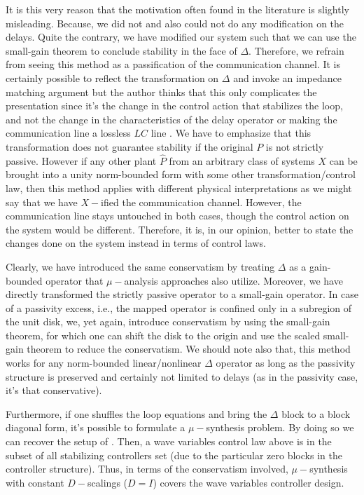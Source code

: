 It is this very reason that the motivation often found in the literature is slightly misleading. Because, we did not 
and also could not do any modification on the delays. Quite the contrary, we have modified our system such that we can use 
the small-gain theorem to conclude stability in the face of $\Delta$. Therefore, we refrain from seeing 
this method as a passification of the communication channel. It is certainly possible to reflect the transformation 
on $\Delta$ and invoke an impedance matching argument but the author thinks that this 
only complicates the presentation since it's the change in the control action that stabilizes the loop, and not the 
change in the characteristics of the delay operator or making the communication line a lossless $LC$ line
.
We have to emphasize that this transformation does not guarantee stability if the original $P$ is not strictly passive.
However if any other plant $\hat{P}$ from an arbitrary class of systems $X$ can be brought into a unity norm-bounded form 
with some other transformation/control law, then this method applies with different physical interpretations as we might 
say that we have $X-$ified the communication channel. However, the communication line stays untouched in both cases, though
the control action on the system would be different. Therefore, it is, in our opinion, better to state the changes done on the
system instead in terms of control laws.  



Clearly, we have introduced the same conservatism by treating $\Delta$ as a gain-bounded operator 
that $\mu-$analysis approaches also utilize. Moreover, we have directly transformed the strictly passive 
operator to a small-gain operator. In case of a passivity excess, i.e., the mapped operator is confined only 
in a subregion of the unit disk, we, yet again, introduce conservatism by using the small-gain theorem, for which 
one can shift the disk to the origin and use the scaled small-gain theorem to reduce the conservatism. We should 
note also that, this method works for any norm-bounded linear/nonlinear $\Delta$ operator as long as the 
passivity structure is preserved and certainly not limited to delays (as in the passivity case, it's that conservative). 

Furthermore, if one shuffles the loop equations and bring the $\Delta$ block to a block diagonal form, it's possible
to formulate a $\mu-$synthesis problem. By doing so we can recover the setup of \cite{leungfa}. Then, a wave variables 
control law above is in the subset of all stabilizing controllers set (due 
to the particular zero blocks in the controller structure). Thus, in terms of the conservatism involved, 
$\mu-$synthesis with constant $D-$scalings ($D=I$) covers the wave variables controller design.

